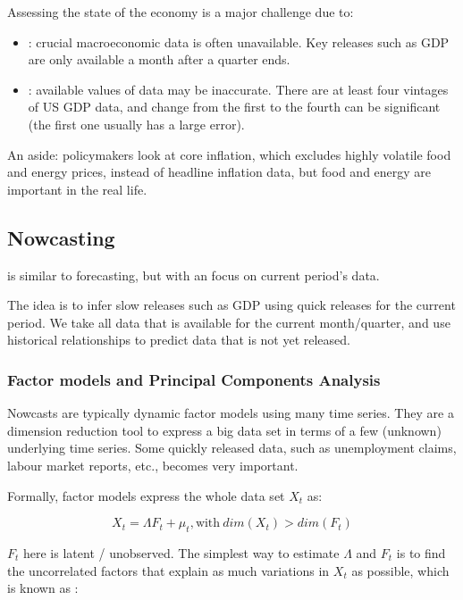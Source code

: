         Assessing the state of the economy is a major challenge due to:
        \begin{itemize}
            \item {}: crucial macroeconomic data is often unavailable. Key releases such as GDP are only available a month after a quarter ends.
            \item {}: available values of data may be inaccurate. There are at least four vintages of US GDP data, and change from the first to the fourth can be significant (the first one usually has a large error).
        \end{itemize}
        
        An aside: policymakers look at core inflation, which excludes highly volatile food and energy prices, instead of headline inflation data, but food and energy are important in the real life.
        
    \subsection{Nowcasting}

         is similar to forecasting, but with an focus on current period's data. 
        
        The idea is to infer slow releases such as GDP using quick releases for the current period. We take all data that is available for the current month/quarter, and use historical relationships to predict data that is not yet released.

        \subsubsection{Factor models and Principal Components Analysis}

            Nowcasts are typically dynamic factor models using many time series. They are a dimension reduction tool to express a big data set in terms of a few (unknown) underlying time series. Some quickly released data, such as unemployment claims, labour market reports, etc., becomes very important.

            Formally, factor models express the whole data set $X_t$ as:
            
            $$X_t = \Lambda F_t + \mu_t, \text{with}\ dim(X_t) > dim(F_t)$$

            $F_t$ here is latent / unobserved. The simplest way to estimate $\Lambda$ and $F_t$ is to find the uncorrelated factors that explain as much variations in $X_t$ as possible, which is known as :

